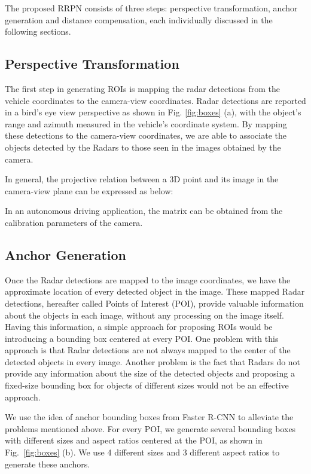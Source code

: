 \documentclass{article}
\begin{document}
The proposed RRPN consists of three steps: perspective transformation, anchor generation 
and distance compensation, each individually discussed in the following 
sections.

\subsection{Perspective Transformation}
\label{sec:persTrans}
The first step in generating ROIs is mapping the radar 
detections from the vehicle coordinates to the camera-view coordinates. Radar 
detections are reported in a bird's eye view perspective as shown in 
Fig. \ref{fig:boxes} (a), with the object's range and azimuth measured in the 
vehicle's coordinate system. By mapping these detections to the camera-view coordinates, 
we are able to associate the objects detected by the Radars to those seen in the 
images obtained by the camera.

In general, the projective relation between a 3D point  and its image
 in the camera-view plane can be expressed as below:


In an autonomous driving application, the matrix  can be obtained from the calibration 
parameters of the camera.

\subsection{Anchor Generation}
Once the Radar detections are mapped to the image coordinates, we have the 
approximate location of every detected object in the image. These mapped Radar 
detections, hereafter called Points of Interest (POI), provide valuable 
information about the objects in each image, without any processing on the image 
itself. Having this information, a simple approach for proposing ROIs 
would be introducing a bounding box centered at every POI. One problem with this 
approach is that Radar detections are not always mapped to the center of the 
detected objects in every image. Another problem is the fact that Radars do not provide 
any information about the size of the detected objects and proposing a fixed-size 
bounding box for objects of different sizes would not be an effective approach.

We use the idea of anchor bounding boxes from 
Faster R-CNN \cite{ren2015faster} to alleviate the problems mentioned above. For every 
POI, we generate several bounding boxes with different sizes and aspect ratios 
centered at the POI, as shown in Fig.~\ref{fig:boxes} (b). 
We use 4 different sizes and 3 different aspect ratios to generate these anchors.
\end{document}
